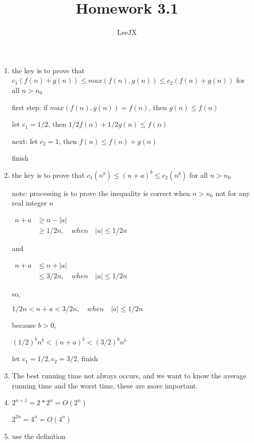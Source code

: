 \documentclass{article}
\title{Homework 3.1}
\author{LeeJX}
\begin{document}
\maketitle

\begin{enumerate}[\textbf{3.1}-1]
\item 
\par the key is to prove that $c_1(f(n)+g(n))\leq max(f(n),g(n)) \leq c_2(f(n)+g(n))$ for all $n>n_0$
\par first step: if $max(f(n),g(n))=f(n)$, then $g(n)\leq f(n)$
\par let $c_1=1/2$, then $1/2f(n)+1/2g(n)\leq f(n)$
\par next: let $c_2=1$, then $f(n)\leq f(n)+g(n)$
\par finish
\item
\par the key is to prove that $c_1(n^b)\leq (n+a)^b \leq c_2(n^b)$ for all $n>n_0$
\par note: processing is to prove the inequality is correct when $n>n_0$ not for any real integer $n$
\par$
\begin{aligned}
n+a & \geq n-|a| 
\\ &\geq 1/2n, \quad when\quad |a| \leq 1/2n
\end{aligned}$
\par and
\par$
\begin{aligned}
n+a & \leq n+|a|\\
& \leq 3/2n, \quad when \quad|a| \leq 1/2n
\end{aligned}
$
\par so,
\par$1/2n<n+a<3/2n,\quad when \quad|a| \leq 1/2n$
\par because $b>0$, 
\par $(1/2)^bn^b<(n+a)^b<(3/2)^bn^b$
\par let $c_1=1/2,c_2=3/2$, finish
\item
\par The best running time not always occurs, and we want to know the average running time and the worst time, these are more important.
\item
\par $2^{n+1}=2*2^n=O(2^n)$
\par $2^{2n}=4^n=O(4^n)$
\item
\par use the definition

\end{enumerate}
\end{document}
